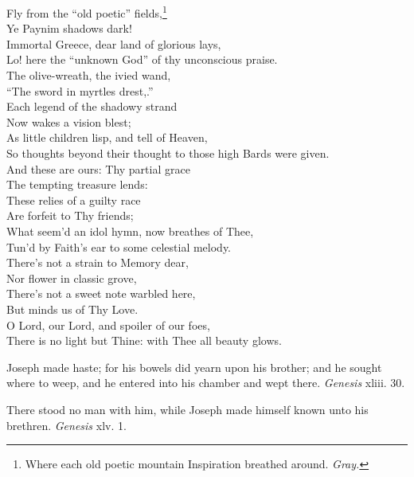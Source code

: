  Fly from the “old poetic” fields,\footnote{Where each old poetic mountain Inspiration breathed around. \emph{Gray.}} \\
 Ye Paynim shadows dark! \\
 Immortal Greece, dear land of glorious lays, \\
 Lo! here the “unknown God” of thy unconscious praise. \\
  The olive-wreath, the ivied wand, \\
 “The sword in myrtles drest,.” \\
 Each legend of the shadowy strand \\
 Now wakes a vision blest; \\
 As little children lisp, and tell of Heaven, \\
 So thoughts beyond their thought to those high Bards were given. \\
  And these are ours: Thy partial grace \\
 The tempting treasure lends: \\
 These relies of a guilty race \\
 Are forfeit to Thy friends; \\
 What seem’d an idol hymn, now breathes of Thee, \\
 Tun’d by Faith’s ear to some celestial melody. \\
  There’s not a strain to Memory dear, \\
 Nor flower in classic grove, \\
 There’s not a sweet note warbled here, \\
 But minds us of Thy Love. \\
 O Lord, our Lord, and spoiler of our foes, \\
 There is no light but Thine: with Thee all beauty glows.\\


Joseph made haste; for his bowels did yearn upon his brother; and he sought where to weep, and he entered into his chamber and wept there. \emph{Genesis} xliii. 30.

There stood no man with him, while Joseph made himself known unto his brethren. \emph{Genesis} xlv. 1.

